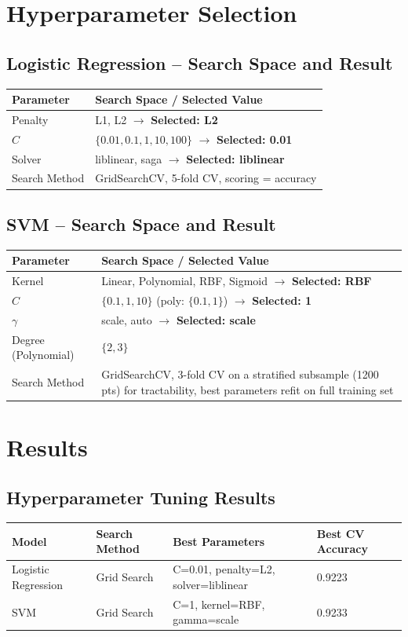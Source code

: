 \documentclass[12pt,a4paper]{article}
\begin{document}
\section{Hyperparameter Selection}

\subsection*{Logistic Regression -- Search Space and Result}
\begin{tabular}{ll}
\toprule
Parameter & Search Space / Selected Value\\
\midrule
Penalty & L1, L2 \quad $\rightarrow$ \textbf{Selected: L2} \\
$C$ & $\{0.01, 0.1, 1, 10, 100\}$ \quad $\rightarrow$ \textbf{Selected: 0.01} \\
Solver & liblinear, saga \quad $\rightarrow$ \textbf{Selected: liblinear} \\
Search Method & GridSearchCV, 5-fold CV, scoring = accuracy \\
\bottomrule
\end{tabular}

\subsection*{SVM -- Search Space and Result}
\begin{tabular}{ll}
\toprule
Parameter & Search Space / Selected Value\\
\midrule
Kernel & Linear, Polynomial, RBF, Sigmoid \quad $\rightarrow$ \textbf{Selected: RBF} \\
$C$ & $\{0.1, 1, 10\}$ (poly: $\{0.1, 1\}$) \quad $\rightarrow$ \textbf{Selected: 1} \\
$\gamma$ & scale, auto \quad $\rightarrow$ \textbf{Selected: scale} \\
Degree (Polynomial) & $\{2, 3\}$ \\
Search Method & GridSearchCV, 3-fold CV on a stratified subsample (1200 pts)
for tractability, best parameters refit on full training set \\
\bottomrule
\end{tabular}

\section{Results}

\subsection*{Hyperparameter Tuning Results}
\begin{tabular}{llll}
\toprule
Model & Search Method & Best Parameters & Best CV Accuracy\\
\midrule
Logistic Regression & Grid Search & C=0.01, penalty=L2, solver=liblinear & 0.9223 \\
SVM & Grid Search & C=1, kernel=RBF, gamma=scale & 0.9233 \\
\bottomrule
\end{tabular}
\end{document}
